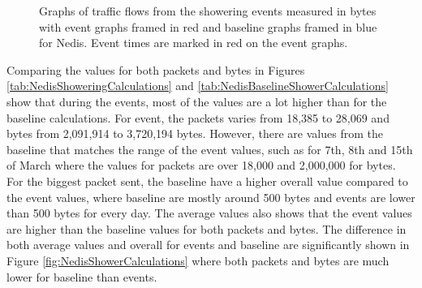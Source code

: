\begin{figure}[H]
\begin{subfigure}[b]{0.47\textwidth}
    \end{subfigure}
        \begin{subfigure}[b]{0.47\textwidth}
        \centering
    \end{subfigure}
    \begin{subfigure}[b]{0.47\textwidth}
        \centering
    \end{subfigure}
    \begin{subfigure}[b]{0.47\textwidth}
        \centering
    \end{subfigure}
    \hspace{0.6cm}
    \begin{subfigure}[b]{0.47\textwidth}
    \centering
        \end{subfigure}
    \caption{Graphs of traffic flows from the showering events measured in bytes with event graphs framed in red and baseline graphs framed in blue for Nedis. Event times are marked in red on the event graphs.}  
    \label{fig:NedisShowerBytes2}
\end{figure}

Comparing the values for both packets and bytes in Figures \ref{tab:NedisShoweringCalculations} and \ref{tab:NedisBaselineShowerCalculations} show that during the events, most of the values are a lot higher than for the baseline calculations. For event, the packets varies from 18,385 to 28,069 and bytes from 2,091,914 to 3,720,194 bytes. However, there are values from the baseline that matches the range of the event values, such as for 7th, 8th and 15th of March where the values for packets are over 18,000 and 2,000,000 for bytes. For the biggest packet sent, the baseline have a higher overall value compared to the event values, where baseline are mostly around 500 bytes and events are lower than 500 bytes for every day. The average values also shows that the event values are higher than the baseline values for both packets and bytes. The difference in both average values and overall for events and baseline are significantly shown in Figure \ref{fig:NedisShowerCalculations} where both packets and bytes are much lower for baseline than events. 

